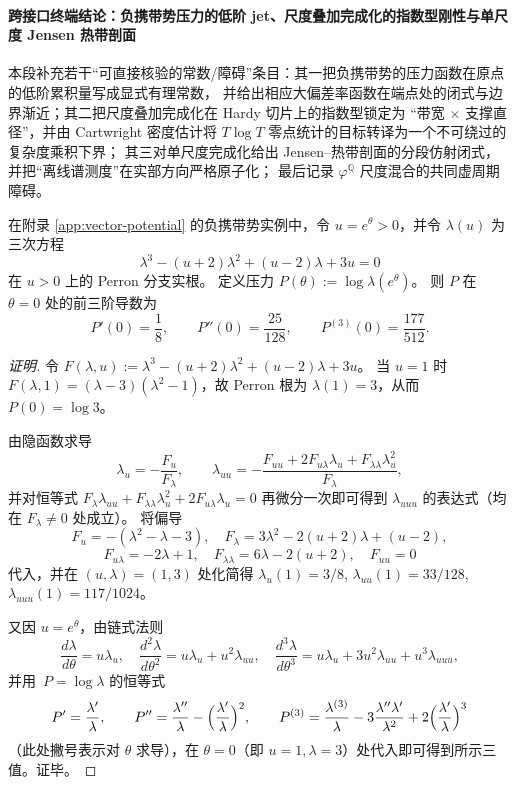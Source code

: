 
\paragraph{跨接口终端结论：负携带势压力的低阶 jet、尺度叠加完成化的指数型刚性与单尺度 Jensen 热带剖面}
本段补充若干“可直接核验的常数/障碍”条目：其一把负携带势的压力函数在原点的低阶累积量写成显式有理常数，
并给出相应大偏差率函数在端点处的闭式与边界渐近；其二把尺度叠加完成化在 Hardy 切片上的指数型锁定为
“带宽 \(\times\) 支撑直径”，并由 Cartwright 密度估计将 \(T\log T\) 零点统计的目标转译为一个不可绕过的复杂度乘积下界；
其三对单尺度完成化给出 Jensen--热带剖面的分段仿射闭式，并把“离线谱测度”在实部方向严格原子化；
最后记录 \(\varphi^{\mathbb Q}\) 尺度混合的共同虚周期障碍。

\begin{conclusion}\label{con:xi-terminal-phi-minus-pressure-loworder-cumulants}
在附录 \ref{app:vector-potential} 的负携带势实例中，令 \(u=e^{\theta}>0\)，并令 \(\lambda(u)\) 为三次方程
\[
\lambda^{3}-(u+2)\lambda^{2}+(u-2)\lambda+3u=0
\]
在 \(u>0\) 上的 Perron 分支实根。
定义压力
\(
P(\theta):=\log\lambda(e^{\theta})
\)。
则 \(P\) 在 \(\theta=0\) 处的前三阶导数为
\[
P'(0)=\frac18,\qquad
P''(0)=\frac{25}{128},\qquad
P^{(3)}(0)=\frac{177}{512}.
\]
\end{conclusion}
\begin{proof}[证明]
令 \(F(\lambda,u):=\lambda^{3}-(u+2)\lambda^{2}+(u-2)\lambda+3u\)。
当 \(u=1\) 时
\(
F(\lambda,1)=(\lambda-3)(\lambda^{2}-1)
\)，故 Perron 根为 \(\lambda(1)=3\)，从而 \(P(0)=\log 3\)。
\par
由隐函数求导
\[
\lambda_u=-\frac{F_u}{F_\lambda},
\qquad
\lambda_{uu}=-\frac{F_{uu}+2F_{u\lambda}\lambda_u+F_{\lambda\lambda}\lambda_u^{2}}{F_\lambda},
\]
并对恒等式
\(
F_\lambda\lambda_{uu}+F_{\lambda\lambda}\lambda_u^{2}+2F_{u\lambda}\lambda_u=0
\)
再微分一次即可得到 \(\lambda_{uuu}\) 的表达式（均在 \(F_\lambda\neq 0\) 处成立）。
将偏导
\[
F_u=-(\lambda^{2}-\lambda-3),\quad
F_\lambda=3\lambda^{2}-2(u+2)\lambda+(u-2),
\]
\[
F_{u\lambda}=-2\lambda+1,\quad
F_{\lambda\lambda}=6\lambda-2(u+2),\quad
F_{uu}=0
\]
代入，并在 \((u,\lambda)=(1,3)\) 处化简得
\(
\lambda_u(1)=3/8
\),
\(
\lambda_{uu}(1)=33/128
\),
\(
\lambda_{uuu}(1)=117/1024
\)。
\par
又因 \(u=e^{\theta}\)，由链式法则
\[
\frac{d\lambda}{d\theta}=u\lambda_u,\quad
\frac{d^{2}\lambda}{d\theta^{2}}=u\lambda_u+u^{2}\lambda_{uu},\quad
\frac{d^{3}\lambda}{d\theta^{3}}=u\lambda_u+3u^{2}\lambda_{uu}+u^{3}\lambda_{uuu},
\]
并用 \(\,P=\log\lambda\) 的恒等式
\[
P'=\frac{\lambda'}{\lambda},\qquad
P''=\frac{\lambda''}{\lambda}-\Bigl(\frac{\lambda'}{\lambda}\Bigr)^{2},\qquad
P^{(3)}=\frac{\lambda^{(3)}}{\lambda}-3\frac{\lambda''\lambda'}{\lambda^{2}}+2\Bigl(\frac{\lambda'}{\lambda}\Bigr)^{3}
\]
（此处撇号表示对 \(\theta\) 求导），在 \(\theta=0\)（即 \(u=1,\lambda=3\)）处代入即可得到所示三值。证毕。
\end{proof}

